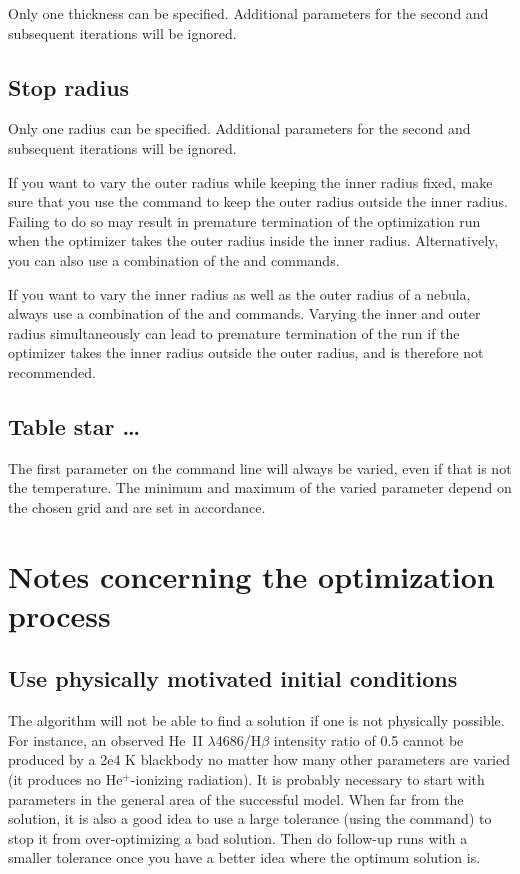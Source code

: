Only one thickness can be specified. Additional parameters for the second
and subsequent iterations will be ignored.

\subsection{Stop radius}

Only one radius can be specified. Additional parameters for the second and
subsequent iterations will be ignored.

If you want to vary the outer radius while keeping the inner radius fixed,
make sure that you use the  command to keep the
outer radius outside the inner radius. Failing to do so may result in
premature termination of the optimization run when the optimizer takes the
outer radius inside the inner radius. Alternatively, you can also use a
combination of the  and  commands.

If you want to vary the inner radius as well as the outer radius of a nebula,
always use a combination of the  and  commands. Varying the inner and outer radius simultaneously can
lead to premature termination of the run if the optimizer takes the inner
radius outside the outer radius, and is therefore not recommended.

\subsection{Table star \ldots}

The first parameter on the command line will always be varied, even if that is
not the temperature.
The minimum and maximum of the varied parameter depend on the chosen grid and
are set in accordance.

\section{Notes concerning the optimization process}

\subsection{Use physically motivated initial conditions}

The algorithm will not be able to find a solution if one is not physically
possible.
For instance, an observed He~II $\lambda $4686/H$\beta$ intensity
ratio of 0.5
cannot be produced by a 2e4 K blackbody no matter how many other
parameters are varied (it produces no He$^+$-ionizing radiation).
It is
probably necessary to start with parameters in the general area of the
successful model.
When far from the solution, it is also a good idea to
use a large tolerance (using the  command)
to stop it
from over-optimizing a bad solution. Then do follow-up runs with a smaller
tolerance once you have a better idea where the optimum solution is.

